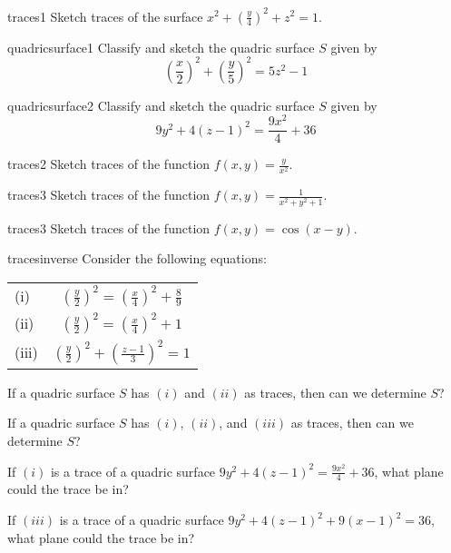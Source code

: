 \begin{problem}{traces1}
Sketch traces of the surface $x^2 + (\frac{y}{4})^2 + z^2 = 1$.
\end{problem}

\begin{problem}{quadricsurface1}
Classify and sketch the quadric surface $S$ given by $$\left(\frac{x}{2}\right)^2+\left(\frac{y}{5}\right)^2 =5z^2 - 1$$
\end{problem}

\begin{problem}{quadricsurface2}
Classify and sketch the quadric surface $S$ given by  $$9y^2+4\left(z-1\right)^2 =\frac{9x^2}{4} + 36$$
\end{problem}

\begin{problem}{traces2}
Sketch traces of the function $f(x,y) = \frac{y}{x^2}$.
\end{problem}

\begin{problem}{traces3}
Sketch traces of the function $f(x,y) = \frac{1}{x^2 + y^2 + 1}$.
\end{problem}

\begin{problem}{traces3}
Sketch traces of the function $f(x,y) = \cos(x-y)$.
\end{problem}

\begin{problem}{tracesinverse}
Consider the following equations:
    \begin{center}
    \def\arraystretch{1.5}
        \begin{tabular}{lc}
(i) & $\left(\frac{y}{2}\right)^2 =\left(\frac{x}{4}\right)^2 + \frac{8}{9}$                                         \\
(ii) & $\left(\frac{y}{2}\right)^2 =\left(\frac{x}{4}\right)^2 + 1$     \\
(iii) & $\left(\frac{y}{2}\right)^2+\left(\frac{z-1}{3}\right)^2 = 1$ 
\end{tabular}
    \end{center}
    
    \begin{subproblems}
    \item If a quadric surface $S$ has $(i)$ and $(ii)$ as traces, then can we determine $S$?
    \item If a quadric surface $S$ has $(i)$, $(ii)$, and $(iii)$ as traces, then can we determine $S$?
    \item If $(i)$ is a trace of a quadric surface $9y^2+4\left(z-1\right)^2 =\frac{9x^2}{4} + 36$, what plane could the trace be in?
    \item If $(iii)$ is a trace of a quadric surface $9y^2 + 4(z-1)^2 + 9(x-1)^2 = 36$, what plane could the trace be in?
    \end{subproblems}
    
\end{problem}


